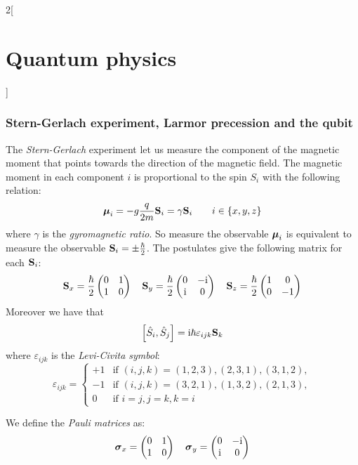 \documentclass[../../../main_physics.tex]{subfiles}
\begin{document}
\begin{multicols}{2}[\section{Quantum physics}]
  \subsubsection{Stern-Gerlach experiment, Larmor precession and the qubit}
  \begin{proposition}
    The \emph{Stern-Gerlach} experiment let us measure the component of the magnetic moment that points towards the direction of the magnetic field. The magnetic moment in each component $i$ is proportional to the spin $S_i$ with the following relation:
    $$\vf\mu_i=-g\frac{q}{2 m} \vf{S}_i=\gamma\vf{S}_i\qquad i\in\{x,y,z\}$$
    where $\gamma$ is the \emph{gyromagnetic ratio}. So measure the observable $\vf\mu_i$ is equivalent to measure the observable $\vf{S}_i=\pm\frac{\hbar}{2}$. The postulates give the following matrix for each $\vf{S}_i$: $$\vf{S}_x=\frac{\hbar}{2}
      \begin{pmatrix}
        0 & 1 \\
        1 & 0
      \end{pmatrix}\quad\vf{S}_y=\frac{\hbar}{2}
      \begin{pmatrix}
        0   & -\ii \\
        \ii & 0
      \end{pmatrix}\quad\vf{S}_z=\frac{\hbar}{2}
      \begin{pmatrix}
        1 & 0  \\
        0 & -1
      \end{pmatrix}$$
    Moreover we have that $$\comm{\hat{S}_i}{\hat{S}_j}=\ii\hbar\varepsilon_{ijk}\vf{S}_k$$ where $\varepsilon_{ijk}$ is the \emph{Levi-Civita symbol}: $$\varepsilon_{ijk}=
      \begin{cases}
        +1 & \text{if } (i,j,k) =(1,2,3), (2,3,1), (3,1,2), \\
        -1 & \text{if } (i,j,k) =(3,2,1), (1,3,2), (2,1,3), \\
        0  & \text{if } i = j, j = k, k = i
      \end{cases}$$
  \end{proposition}
  \begin{definition}
    We define the \emph{Pauli matrices} as: $$\vf{\sigma}_x=
      \begin{pmatrix}
        0 & 1 \\
        1 & 0
      \end{pmatrix}\quad\vf{\sigma}_y=
      \begin{pmatrix}
        0   & -\ii \\
        \ii & 0

\end{pmatrix}$$
\end{definition}
\end{multicols}
\end{document}
